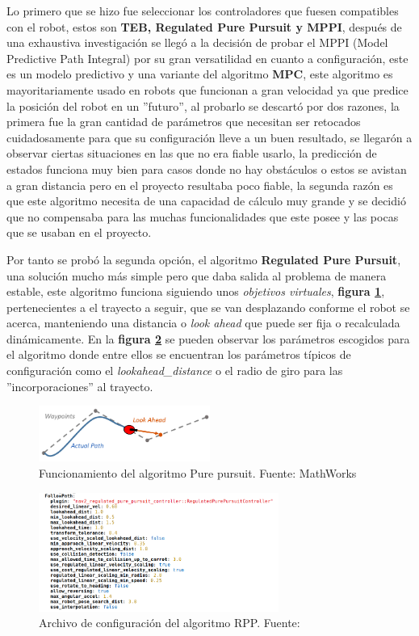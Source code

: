 Lo primero que se hizo fue 
seleccionar los controladores que fuesen compatibles con el robot, estos son \textbf{TEB, Regulated Pure Pursuit y MPPI}, después de una exhaustiva investigación 
se llegó a la decisión de probar el MPPI (Model Predictive Path Integral) por su gran versatilidad en cuanto a configuración, este es un modelo predictivo y una variante del algoritmo \textbf{MPC}, este algoritmo 
es mayoritariamente usado en robots que funcionan a gran velocidad ya que predice la posición del robot en un ''futuro'', al probarlo se descartó por dos 
razones, la primera fue la gran cantidad de parámetros que necesitan ser retocados cuidadosamente para que su configuración lleve a un buen resultado, se llegarón a observar ciertas situaciones en las que no era fiable usarlo, la predicción 
de estados funciona muy bien para casos donde no hay obstáculos o estos se avistan a gran distancia pero en el proyecto resultaba poco fiable, la segunda razón 
es que este algoritmo necesita de una capacidad de cálculo muy grande y se decidió que no compensaba para las muchas funcionalidades que este posee y las pocas 
que se usaban en el proyecto.

Por tanto se probó la segunda opción, el algoritmo \textbf{Regulated Pure Pursuit}, una solución mucho más simple pero 
que daba salida al problema de manera estable, este algoritmo funciona siguiendo unos \textit{objetivos virtuales}, 
\textbf{figura \ref{fig:pure_pursui_teoria}}, pertenecientes a el trayecto a seguir, que se van desplazando conforme el robot se acerca, 
manteniendo una distancia o \textit{look ahead} que puede ser fija o recalculada dinámicamente. En la 
\textbf{figura \ref{fig:rpp_configuracion}} se pueden observar los parámetros escogidos para el algoritmo donde entre ellos se encuentran 
los parámetros típicos de configuración como el \textit{lookahead\_distance} o el radio de giro para las ''incorporaciones'' al trayecto.
\begin{figure}[h]
    \centering
    \includegraphics[width=0.5\textwidth]{images/pure_pursuit_teoria.png}
    \caption{Funcionamiento del algoritmo Pure pursuit. Fuente: MathWorks}
    \label{fig:pure_pursui_teoria}
\end{figure}

\begin{figure}[H]
    \centering
    \includegraphics[width=0.7\textwidth]{images/rpp_configuracion.png}
    \caption{Archivo de configuración del algoritmo RPP. Fuente: \cite{nav2}}
    \label{fig:rpp_configuracion}
\end{figure}

